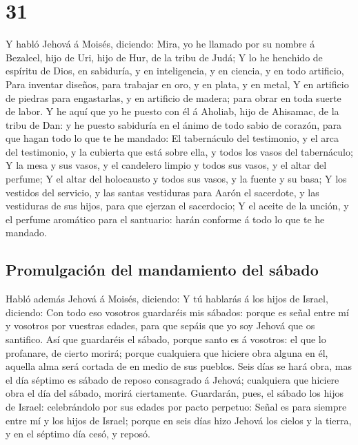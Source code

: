 \hypertarget{section-30}{%
\section{31}\label{section-30}}

 Y habló Jehová á Moisés, diciendo:  Mira, yo he
llamado por su nombre á Bezaleel, hijo de Uri, hijo de Hur, de la tribu
de Judá;  Y lo he henchido de espíritu de Dios, en
sabiduría, y en inteligencia, y en ciencia, y en todo artificio,
 Para inventar diseños, para trabajar en oro, y en plata, y
en metal,  Y en artificio de piedras para engastarlas, y en
artificio de madera; para obrar en toda suerte de labor.  Y
he aquí que yo he puesto con él á Aholiab, hijo de Ahisamac, de la tribu
de Dan: y he puesto sabiduría en el ánimo de todo sabio de corazón, para
que hagan todo lo que te he mandado:  El tabernáculo del
testimonio, y el arca del testimonio, y la cubierta que está sobre ella,
y todos los vasos del tabernáculo;  Y la mesa y sus vasos, y
el candelero limpio y todos sus vasos, y el altar del perfume;
 Y el altar del holocausto y todos sus vasos, y la fuente y
su basa;  Y los vestidos del servicio, y las santas
vestiduras para Aarón el sacerdote, y las vestiduras de sus hijos, para
que ejerzan el sacerdocio;  Y el aceite de la unción, y el
perfume aromático para el santuario: harán conforme á todo lo que te he
mandado.

\hypertarget{promulgaciuxf3n-del-mandamiento-del-suxe1bado}{%
\subsection{Promulgación del mandamiento del
sábado}\label{promulgaciuxf3n-del-mandamiento-del-suxe1bado}}

 Habló además Jehová á Moisés, diciendo:  Y tú
hablarás á los hijos de Israel, diciendo: Con todo eso vosotros
guardaréis mis sábados: porque es señal entre mí y vosotros por vuestras
edades, para que sepáis que yo soy Jehová que os santifico.
 Así que guardaréis el sábado, porque santo es á vosotros:
el que lo profanare, de cierto morirá; porque cualquiera que hiciere
obra alguna en él, aquella alma será cortada de en medio de sus pueblos.
 Seis días se hará obra, mas el día séptimo es sábado de
reposo consagrado á Jehová; cualquiera que hiciere obra el día del
sábado, morirá ciertamente.  Guardarán, pues, el sábado los
hijos de Israel: celebrándolo por sus edades por pacto perpetuo:
 Señal es para siempre entre mí y los hijos de Israel;
porque en seis días hizo Jehová los cielos y la tierra, y en el séptimo
día cesó, y reposó.

